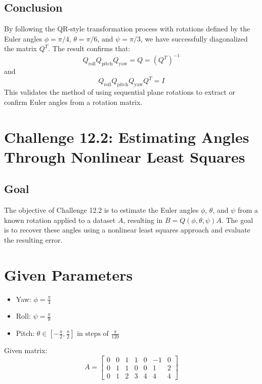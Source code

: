 \documentclass[12pt]{article}
\begin{document}
\subsection*{Conclusion}
By following the QR-style transformation process with rotations defined by the Euler angles $\phi = \pi/4$, $\theta = \pi/6$, and $\psi = \pi/3$, we have successfully diagonalized the matrix $Q^T$. The result confirms that:
\[
Q_{\text{roll}} Q_{\text{pitch}} Q_{\text{yaw}} = Q = (Q^T)^{-1}
\]
and
\[
Q_{\text{roll}} Q_{\text{pitch}} Q_{\text{yaw}} Q^T = I
\]
This validates the method of using sequential plane rotations to extract or confirm Euler angles from a rotation matrix.




\section*{Challenge 12.2: Estimating Angles Through Nonlinear Least Squares}


\subsection*
{Goal}
The objective of Challenge 12.2 is to estimate the Euler angles \( \phi \), \( \theta \), and \( \psi \) from a known rotation applied to a dataset \( A \), resulting in \( B = Q(\phi, \theta, \psi) A \). The goal is to recover these angles using a nonlinear least squares approach and evaluate the resulting error.



\section*{Given Parameters}
\begin{itemize}
  \item Yaw: \( \phi = \frac{\pi}{4} \)
  \item Roll: \( \psi = \frac{\pi}{9} \)
  \item Pitch: \( \theta \in [-\frac{\pi}{2}, \frac{\pi}{2}] \text{ in steps of } \frac{\pi}{120} \)
\end{itemize}

\noindent Given matrix:
\[
A = \begin{bmatrix}
0 & 0 & 1 & 1 & 0 & -1 & 0 \\
0 & 1 & 1 & 0 & 0 & 1 & 2 \\
0 & 1 & 2 & 3 & 4 & 4 & 4
\end{bmatrix}
\]
\end{document}
